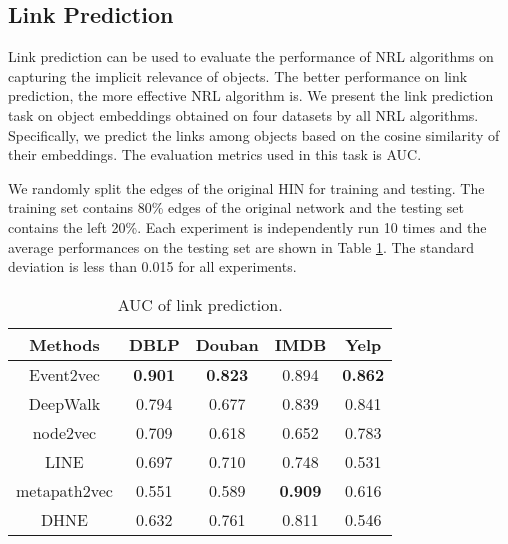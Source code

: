 \subsection{Link Prediction}
Link prediction can be used to evaluate the performance of NRL algorithms on capturing the implicit relevance of objects. The better performance on link prediction, the more effective NRL algorithm is. We present the link prediction task on object embeddings obtained on four datasets by all NRL algorithms. Specifically, we predict the links among objects based on the cosine similarity of their embeddings. The evaluation metrics used in this task is AUC.

We randomly split the edges of the original HIN for training and testing. The training set contains 80\% edges of the original network and the testing set contains the left 20\%. Each experiment is independently run 10 times and the average performances on the testing set are shown in Table \ref{table3}. The standard deviation is less than 0.015 for all experiments.

\begin{table}
	\centering
	\caption{{\small AUC of link prediction.}}\label{table3}
	\begin{tabular}{|c|c|c|c|c|}
		\toprule
		Methods & DBLP & Douban & IMDB & Yelp \\
		\midrule
		Event2vec & \textbf{0.901} & \textbf{0.823} & 0.894 & \textbf{0.862} \\
		DeepWalk & 0.794 & 0.677 & 0.839 & 0.841 \\
		node2vec & 0.709 & 0.618 & 0.652 & 0.783 \\
		LINE & 0.697 & 0.710 & 0.748 & 0.531 \\
		metapath2vec & 0.551 & 0.589 & \textbf{0.909} & 0.616 \\
		DHNE & 0.632 & 0.761 & 0.811 & 0.546 \\
		\bottomrule
	\end{tabular}
\end{table}

